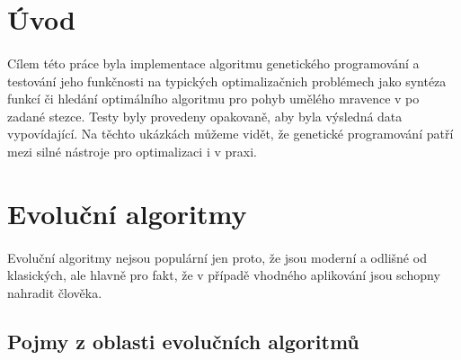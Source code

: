 \documentclass[bc,male,java,dept460]{diploma}		%
\begin{document}
\MakeTitlePages

\tableofcontents
\cleardoublepage	%

\listoftables
\cleardoublepage	%

\listoffigures
\cleardoublepage	%

\lstlistoflistings
\cleardoublepage	%

\section{Úvod}
\label{sec:Uvod}
\paragraph*{}
Cílem této práce byla implementace algoritmu genetického programování a testování jeho funkčnosti na typických optimalizačnich problémech jako syntéza funkcí či hledání optimálního algoritmu pro pohyb umělého mravence v po zadané stezce. Testy byly provedeny opakovaně, aby byla výsledná data vypovídající. Na těchto ukázkách můžeme vidět, že genetické programování patří mezi silné nástroje pro optimalizaci i v praxi.

\section{Evoluční algoritmy}
\paragraph*{}
Evoluční algoritmy nejsou populární jen proto, že jsou moderní a odlišné od klasických, ale hlavně pro fakt, že v případě vhodného aplikování jsou schopny nahradit člověka.

\subsection{Pojmy z oblasti evolučních algoritmů}
\end{document}
